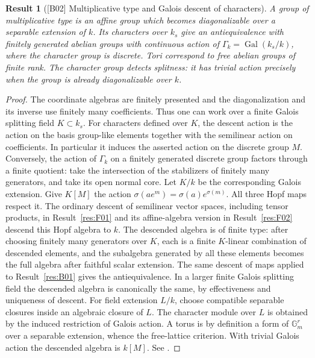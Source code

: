 \documentclass[11pt,a4paper,openany,oneside]{book}
\theoremstyle{resultstyle}
\newtheorem{statement}{Result}[chapter]
\newenvironment{result}[2]{\clubpenalty=10000\begin{statement}[\textnormal{[#1]} #2]\leavevmode\label{res:#1}\ignorespaces}{\end{statement}}
\theoremstyle{definition}
\numberwithin{equation}{chapter}
\begin{document}
\begin{result}{B02}{Multiplicative type and Galois descent of characters}
A group of multiplicative type is an affine group which becomes
diagonalizable over a separable extension of \(k\). Its characters over
\(k_s\) give an antiequivalence with finitely generated abelian groups
with continuous action of \(\Gamma_k=\operatorname{Gal}(k_s/k)\), where
the character group is discrete. Tori correspond to free abelian groups
of finite rank. The character group detects splitness: it has trivial
action precisely when the group is already diagonalizable over \(k\).
\end{result}

\begin{proof}
The coordinate algebras are finitely presented and the diagonalization
and its inverse use finitely many coefficients. Thus one can work over
a finite Galois splitting field \(K\subset k_s\).
For characters defined over \(K\), the descent action is the action
on the basis group-like elements together with the semilinear
action on coefficients. In particular it induces the asserted
action on the discrete group \(M\). Conversely, the action of
\(\Gamma_k\) on a finitely generated discrete group factors through a
finite quotient: take the intersection of the stabilizers of finitely
many generators, and take its open normal core. Let \(K/k\) be the
corresponding Galois extension. Give \(K[M]\) the action
\(\sigma(a e^m)=\sigma(a)e^{\sigma(m)}\).
All three Hopf maps respect it. The ordinary descent of semilinear
vector spaces, including tensor products, in Result~\ref{res:F01}
and its affine-algebra version in Result~\ref{res:F02} descend this
Hopf algebra to \(k\). The descended algebra is of finite type:
after choosing finitely many generators over \(K\), each is a
finite \(K\)-linear combination of descended elements, and the
subalgebra generated by all these elements becomes the full algebra
after faithful scalar extension. The same descent of maps applied
to Result~\ref{res:B01} gives the antiequivalence. In a larger finite
Galois splitting field the descended algebra is canonically the same,
by effectiveness and uniqueness of descent. For field extension
\(L/k\), choose compatible separable closures inside an algebraic
closure of \(L\). The character module over \(L\) is obtained by the
induced restriction of Galois action.
A torus is by definition a form of \(\mathbb G_m^r\) over a separable
extension, whence the free-lattice criterion. With trivial Galois
action the descended algebra is \(k[M]\).
See \cite[Definitions 12.14 and 12.17, Theorems 12.18 and 12.23]{milne}.
\end{proof}
\end{document}
